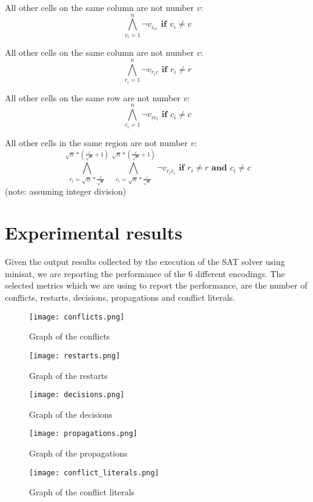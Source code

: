 \documentclass[letterpaper]{article}
\begin{document}
All other cells on the same column are not number $v$:
$$
\bigwedge_{v_i=1}^{n} \neg v_{i_{rc}} \textbf{ if } v_i \neq v
$$

All other cells on the same column are not number $v$:
$$
\bigwedge_{r_i=1}^{n} \neg v_{r_{i}c} \textbf{ if } r_i \neq r
$$

All other cells on the same row are not number $v$:
$$
\bigwedge_{c_i=1}^{n} \neg v_{rc_i} \textbf{ if } c_i \neq c
$$

All other cells in the same region are not number $v$:
$$
\bigwedge_{r_i = \sqrt{n} * \frac{r}{\sqrt{n}}}^{\sqrt{n} * (\frac{r}{\sqrt{n}} + 1)}
\bigwedge_{c_i = \sqrt{n} * \frac{c}{\sqrt{n}}}^{\sqrt{n} * (\frac{c}{\sqrt{n}} + 1)}
\neg v_{r_{i}c_{i}} \textbf{ if } r_i \neq r \textbf{ and } c_i \neq c
$$
(note: assuming integer division)\\

\section{Experimental results}

Given the output results collected by the execution of the SAT solver using minisat, we are reporting the performance of the 6 different encodings. The selected metrics which we are using to report the performance, are the number of conflicts, restarts, decisions, propagations and conflict literals.

\begin{figure}
\texttt{[image: conflicts.png]}
\caption{Graph of the conflicts}
\end{figure}

\begin{figure}
\texttt{[image: restarts.png]}
\caption{Graph of the restarts}
\end{figure}

\begin{figure}
\texttt{[image: decisions.png]}
\caption{Graph of the decisions}
\end{figure}

\begin{figure}
\texttt{[image: propagations.png]}
\caption{Graph of the propagations}
\end{figure}

\begin{figure}
\texttt{[image: conflict\_literals.png]}
\caption{Graph of the conflict literals}
\end{figure}
\end{document}
